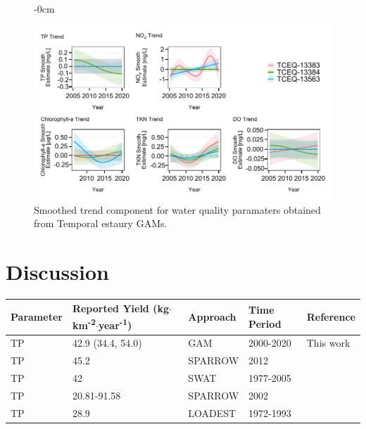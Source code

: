 \documentclass[water,article,submit,oneauthor]{Definitions/mdpi}
\begin{document}
\begin{figure}[H]\begin{adjustwidth}{-\extralength}{0cm}

{\centering \includegraphics[width=1\linewidth]{Schramm-Manuscript-2023_files/figure-latex/long-smooths-1} 

}

\end{adjustwidth}\caption[Smoothed trend component for water quality paramaters obtained from Temporal estaury GAMs]{Smoothed trend component for water quality paramaters obtained from Temporal estaury GAMs.}\label{fig:long-smooths}
\end{figure}

\hypertarget{discussion}{%
\section{Discussion}\label{discussion}}

\begin{table}[H]

\begin{tabular}[t]{lllll}
\toprule
Parameter & \makecell[c]{Reported Yield\\(kg$\cdot$km\textsuperscript{-2}$\cdot$year\textsuperscript{-1})} & Approach & Time Period & Reference\\
\midrule
TP & 42.9 (34.4, 54.0) & GAM & 2000-2020 & This work\\
TP & 45.2 & SPARROW & 2012 & \citet{wise_spatially_2019}\\
TP & 42 & SWAT & 1977-2005 & \citet{omaniEstimationSedimentNutrient2014}\\
TP & 20.81-91.58 & SPARROW & 2002 & \citet{rebich_sources_2011}\\
TP & 28.9 & LOADEST & 1972-1993 & \citet{dunnTrendsNutrientInflows1996}\\
\bottomrule
\end{tabular}
\end{table}
\end{document}
